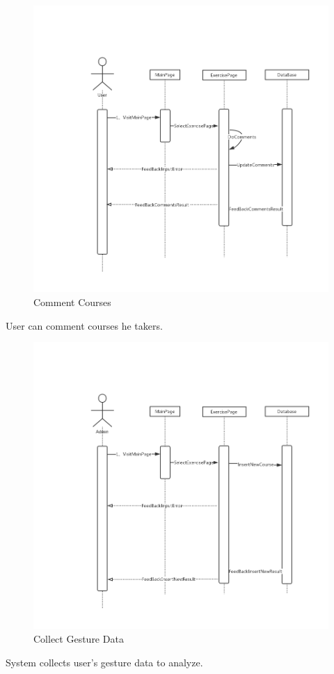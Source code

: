 \documentclass[16pt]{scrreprt}
\begin{document}
\begin{figure}[H]
    \includegraphics[width=\linewidth]{./FuncPhoto/13.png}   
    \caption{Comment Courses}
\end{figure}
User can comment courses he takers.

\begin{figure}[H]
    \includegraphics[width=\linewidth]{./FuncPhoto/14.png}   
    \caption{Collect Gesture Data}
\end{figure}
System collects user's gesture data to analyze.
\end{document}
